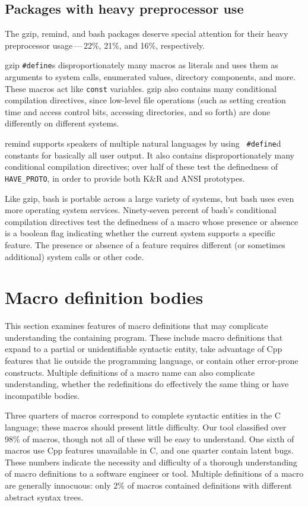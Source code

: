 \documentclass[10pt]{article}
\newcommand{\pkg}[1]{\textsf{#1}}
\begin{document}
\subsection{Packages with heavy preprocessor use}

The \pkg{gzip}, \pkg{remind}, and \pkg{bash} packages deserve
special attention for their heavy preprocessor usage\,---\,22\%, 21\%, and
16\%, respectively.

\pkg{gzip} {\tt \#define}s disproportionately many macros as literals and
uses them as arguments to system calls, enumerated values, directory
components, and more.  These macros act like {\tt const} variables.
\pkg{gzip} also contains many conditional compilation directives, since
low-level file operations (such as setting creation time and access control
bits, accessing directories, and so forth) are done differently on
different systems.

\pkg{remind} supports speakers of multiple natural languages by using {\tt
\#define}d constants for basically all user output.  It also contains
disproportionately many conditional compilation directives; over half of
these test the definedness of \verb|HAVE_PROTO|, in order to provide both
K\&R and ANSI prototypes.

Like \pkg{gzip}, \pkg{bash} is portable across a large variety of
systems, but \pkg{bash} uses even more operating system services.
Ninety-seven percent of \pkg{bash}'s conditional compilation directives
test the definedness of a macro whose presence or absence is a boolean
flag indicating whether the current system supports a specific feature.
The presence or absence of a feature requires different (or sometimes
additional) system calls or other code.


\section{Macro definition bodies}
\label{sec:categorization}

This section examines features of macro definitions that may complicate
understanding the containing program.  These include macro definitions that
expand to a partial or unidentifiable syntactic entity, take advantage of
Cpp features that lie outside the programming language, or contain other
error-prone constructs.  Multiple definitions of a macro name can also
complicate understanding, whether the redefinitions do effectively the same
thing or have incompatible bodies.

Three quarters of macros correspond to complete syntactic entities in the C
language; these macros should present little difficulty.  Our tool
classified over 98\% of macros, though not all of these will be easy to
understand.  One sixth of macros use Cpp features unavailable in C, and
one quarter contain latent bugs.  These numbers indicate the necessity
and difficulty of a thorough understanding of macro definitions to a
software engineer or tool.  Multiple definitions of a macro are generally
innocuous:  only 2\% of macros contained definitions with different
abstract syntax trees.
\end{document}
